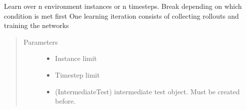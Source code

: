 \documentclass[letterpaper,10pt,english]{sphinxmanual}
\begin{document}
\begin{fulllineitems}
\begin{fulllineitems}
\end{fulllineitems}


\begin{fulllineitems}
\label{\detokenize{agents.reinforcement_learning:agents.reinforcement_learning.ppo.PPO.learn}}
\sphinxAtStartPar
Learn over n environment instances or n timesteps. Break depending on which condition is met first
One learning iteration consists of collecting rollouts and training the networks
\begin{quote}\begin{description}
\item[{Parameters}] \leavevmode\begin{itemize}
\item {} 
\sphinxAtStartPar
{} \textendash{} Instance limit

\item {} 
\sphinxAtStartPar
{} \textendash{} Timestep limit

\item {} 
\sphinxAtStartPar
{} \textendash{} (IntermediateTest) intermediate test object. Must be created before.

\end{itemize}

\end{description}\end{quote}

\end{fulllineitems}


\end{fulllineitems}

\end{document}

